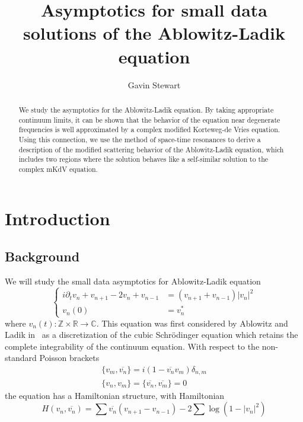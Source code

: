 \documentclass[letterpaper, reqno,final]{amsart}
\title{Asymptotics for small data solutions of the Ablowitz-Ladik equation}
\author{Gavin Stewart}
\newcommand{\bbZ}{\mathbb{Z}}
\newcommand{\bbR}{\mathbb{R}}
\begin{document}
\maketitle
\begin{abstract}
    We study the asymptotics for the Ablowitz-Ladik equation.  By taking appropriate continuum limits, it can be shown that the behavior of the equation near degenerate frequencies is well approximated by a complex modified Korteweg-de Vries equation.  Using this connection, we use the method of space-time resonances to derive a description of the modified scattering behavior of the Ablowitz-Ladik equation, which includes two regions where the solution behaves like a self-similar solution to the complex mKdV equation.
\end{abstract}

\section{Introduction\label{sec:intro}}

\subsection{Background}

We will study the small data asymptotics for Ablowitz-Ladik equation
\begin{equation}\label{eqn:AL-eqn}
    \left\{\begin{aligned}
    i\partial_t v_n + v_{n+1} - 2 v_n + v_{n-1} &= (v_{n+1} + v_{n-1}) |v_n|^2\\ 
    v_n(0) &= v^{*}_n
\end{aligned}\right.
\end{equation}
where $v_n(t) : \bbZ \times \bbR \to \mathbb{C}$.  This equation was first considered by Ablowitz and Ladik in~\cite{ablowitzNonlinearDifferentialdifferenceEquations1976} as a discretization of the cubic Schr\"odinger equation which retains the complete integrability of the continuum equation.  With respect to the non-standard Poisson brackets
\begin{equation*}	\begin{split} %
    \{v_m,\overline{v_n}\} = i \left(1 - \overline{v_n}v_m\right) \delta_{n,m}\\
        \{v_n,v_m\} = \{\overline{v_n}, \overline{v_m}\} = 0
\end{split}\end{equation*}
the equation has a Hamiltonian structure, with Hamiltonian
\begin{equation*}
    H(v_n, \overline{v_n}) =  \sum \overline{v_n}\left( v_{n+1} - v_{n-1}\right) - 2 \sum \log \left(1 - |v_n|^2 \right)
\end{equation*}
\end{document}
